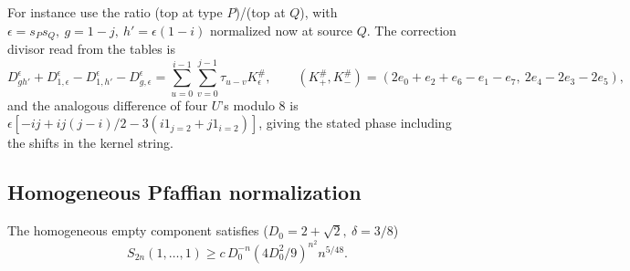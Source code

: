For instance use the ratio (top at type \(P\))/(top at \(Q\)), with \(\epsilon=s_Ps_Q,\ g=1-j,\ h'=\epsilon(1-i)\) normalized now at source \(Q\). The correction divisor read from the tables is
\[
 D^\epsilon_{g h'}+D^\epsilon_{1,\epsilon}-D^\epsilon_{1,h'}-D^\epsilon_{g,\epsilon}
 =\sum_{u=0}^{i-1}\sum_{v=0}^{j-1}\tau_{u-v} K_\epsilon^\#,\qquad
 (K_+^\#,K_-^\#)=(2e_0+e_2+e_6-e_1-e_7,\ 2e_4-2e_3-2e_5),
\]
and the analogous difference of four \(U\)'s modulo 8 is \(\epsilon[-ij+ij(j-i)/2-3(i1_{j=2}+j1_{i=2})]\), giving the stated phase including the shifts in the kernel string.

\subsection{Homogeneous Pfaffian normalization}\label{c01-c1-homogeneous-pfaffian-normalization}

\begin{proposition}\label{prop:pv:denominator}
The homogeneous empty component satisfies (\(D_0=2+\sqrt2,\ \delta=3/8\))
\[
 S_{2n}(1,\ldots,1)\ge c\,D_0^{-n}(4D_0^2/9)^{n^2} n^{5/48}.
\]
\end{proposition}


